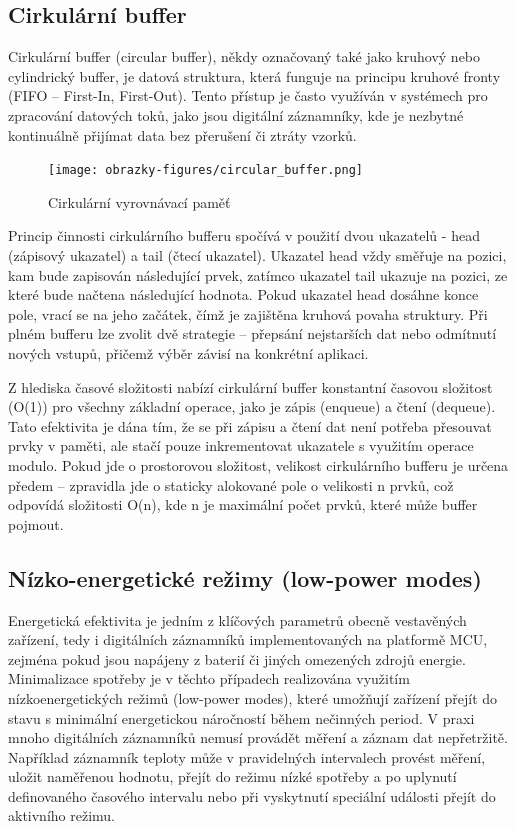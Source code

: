 \subsection{Cirkulární buffer}
Cirkulární buffer (circular buffer), někdy označovaný také jako kruhový nebo cylindrický buffer, je datová struktura, která funguje na principu kruhové fronty (FIFO – First-In, First-Out). 
Tento přístup je často využíván v systémech pro zpracování datových toků, jako jsou digitální záznamníky, kde je nezbytné kontinuálně přijímat data bez přerušení či ztráty vzorků.


\begin{figure}[h]
    \centering
    \texttt{[image: obrazky-figures/circular\_buffer.png]}
    
    \caption{Cirkulární vyrovnávací paměť}
    \label{fig:circular-buffer}
\end{figure}

\newpage

Princip činnosti cirkulárního bufferu spočívá v použití dvou ukazatelů - head (zápisový ukazatel) a tail (čtecí ukazatel). Ukazatel head vždy směřuje na pozici, kam bude zapisován následující 
prvek, zatímco ukazatel tail ukazuje na pozici, ze které bude načtena následující hodnota. Pokud ukazatel head dosáhne konce pole, vrací se na jeho začátek, čímž je zajištěna kruhová povaha 
struktury. Při plném bufferu lze zvolit dvě strategie – přepsání nejstarších dat nebo odmítnutí nových vstupů, přičemž výběr závisí na konkrétní 
aplikaci.\cite{embedjournal_ring_buffer, medium_ring_buffer}

Z hlediska časové složitosti nabízí cirkulární buffer konstantní časovou složitost (O(1)) pro všechny základní operace, jako je zápis (enqueue) a  čtení (dequeue). Tato efektivita je dána tím, 
že se při zápisu a čtení dat není potřeba přesouvat prvky v paměti, ale stačí pouze inkrementovat ukazatele s využitím operace modulo. Pokud jde o prostorovou složitost, velikost cirkulárního 
bufferu je určena předem – zpravidla jde o staticky alokované pole o velikosti n prvků, což odpovídá složitosti O(n), kde n je maximální počet prvků, které může buffer pojmout. 
\cite{petrungaro_ring_buffer_complexity}

\subsection{Nízko-energetické režimy (low-power modes)}
Energetická efektivita je jedním z klíčových parametrů obecně vestavěných zařízení, tedy i digitálních záznamníků implementovaných na platformě MCU, zejména pokud jsou napájeny z baterií či 
jiných omezených zdrojů energie. Minimalizace spotřeby je v těchto případech realizována využitím nízkoenergetických režimů (low-power modes), které umožňují zařízení přejít do stavu s 
minimální energetickou náročností během nečinných period. V praxi mnoho digitálních záznamníků nemusí provádět měření a záznam dat nepřetržitě. Například záznamník teploty může v pravidelných 
intervalech provést měření, uložit naměřenou hodnotu, přejít do režimu nízké spotřeby a po uplynutí definovaného časového intervalu nebo při vyskytnutí speciální události přejít do aktivního 
režimu. \cite{analog_devices_low_power_modes}

